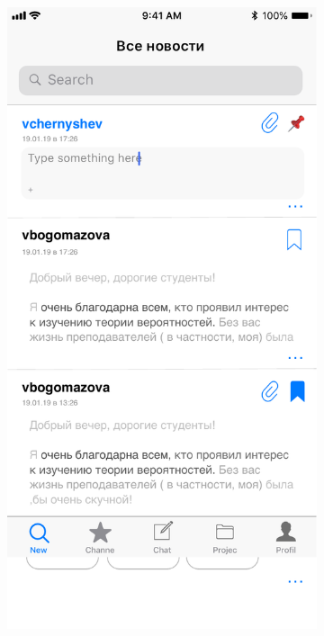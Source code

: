 \documentclass[a4paper,12pt]{article}
\begin{document}
\begin{figure}[h!]
\begin{subfigure}[b]{0.3\linewidth}
		\end{subfigure}
		\begin{subfigure}[b]{0.3\linewidth}
			\includegraphics[width=\linewidth]{../includes/prototype/2.pdf}
		\end{subfigure}

\end{figure}
\end{document}
